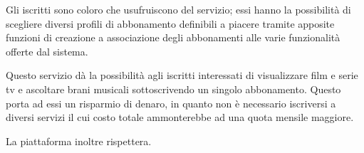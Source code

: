 \begin{flushleft}
    {Gli iscritti sono coloro che usufruiscono del servizio; essi hanno la possibilità di scegliere diversi profili di abbonamento definibili a piacere tramite apposite funzioni di creazione a associazione degli abbonamenti alle varie funzionalità offerte dal sistema.}
\end{flushleft}

\begin{flushleft}
    {Questo servizio dà la possibilità agli iscritti interessati di visualizzare film e serie tv e ascoltare brani musicali sottoscrivendo un singolo abbonamento. Questo porta ad essi un risparmio di denaro, in quanto non è necessario iscriversi a diversi servizi il cui costo totale ammonterebbe ad una quota mensile maggiore.}
\end{flushleft}

\begin{flushleft}
    {La piattaforma inoltre rispettera.}
\end{flushleft}